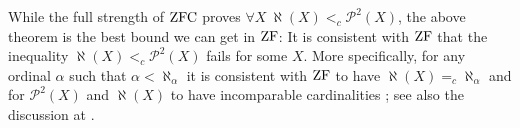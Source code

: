 While the full strength of $\mathrm{ZFC}$ proves $\forall X \ \aleph(X) <_c \mathcal{P}^{2}(X)$, the above theorem is the best bound we can get in $\mathrm{ZF}$: It is consistent with $\mathrm{ZF}$ that the inequality $\aleph(X) <_c \mathcal{P}^2(X)$ fails for some $X$. More specifically, for any ordinal $\alpha$ such that $\alpha < \aleph_{\alpha}$ it is consistent with $\mathrm{ZF}$ to have $\aleph(X) =_c \aleph_\alpha$ and for $\mathcal{P}^{2}(X)$ and $\aleph(X)$ to have incomparable cardinalities \cite[Theorems 10 and 11]{hickman};
see also the discussion at \cite{stack_powerset}.






